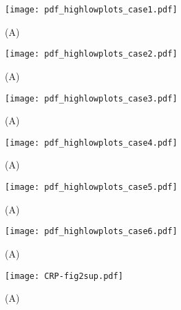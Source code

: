 \begin{figure}%
	\centering
	\texttt{[image: pdf\_highlowplots\_case1.pdf]}
	\caption{ 
		(A) 
	}
	\label{fig:CRP:XXX}
\end{figure}%
\begin{figure}%
	\centering
	\texttt{[image: pdf\_highlowplots\_case2.pdf]}
	\caption{ 
		(A) 
	}
	\label{fig:CRP:XXX}
\end{figure}%
\begin{figure}%
	\centering
	\texttt{[image: pdf\_highlowplots\_case3.pdf]}
	\caption{ 
		(A) 
	}
	\label{fig:CRP:XXX}
\end{figure}%
\begin{figure}%
	\centering
	\texttt{[image: pdf\_highlowplots\_case4.pdf]}
	\caption{ 
		(A) 
	}
	\label{fig:CRP:XXX}
\end{figure}%
\begin{figure}%
	\centering
	\texttt{[image: pdf\_highlowplots\_case5.pdf]}
	\caption{ 
		(A) 
	}
	\label{fig:CRP:XXX}
\end{figure}%
\begin{figure}%
	\centering
	\texttt{[image: pdf\_highlowplots\_case6.pdf]}
	\caption{ 
		(A) 
	}
	\label{fig:CRP:XXX}
\end{figure}%






\begin{figure}
	\centering
	\texttt{[image: CRP-fig2sup.pdf]}
	\caption{ 
		(A) 
	}
	\label{fig:CRP:fig2}
\end{figure}

